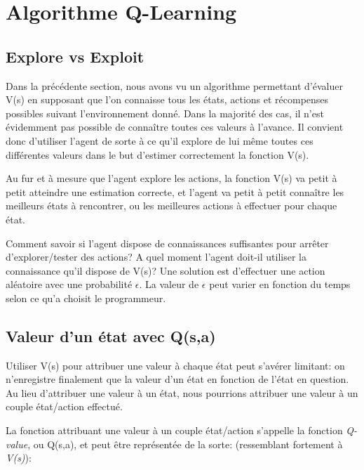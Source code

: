 \documentclass[11pt,a4paper]{report}
\begin{document}
  \section{Algorithme Q-Learning}
  
  \subsection{Explore vs Exploit} 
  
    \par Dans la précédente section, nous avons vu un algorithme permettant d'évaluer V(s) en supposant que l'on connaisse tous les états, actions et récompenses possibles suivant l'environnement donné. Dans la majorité des cas, il n'est évidemment pas possible de connaître toutes ces valeurs à l'avance. Il convient donc d'utiliser l'agent de sorte à ce qu'il explore de lui même toutes ces différentes valeurs dans le but d'estimer correctement la fonction V(s).     
    
    \par Au fur et à mesure que l'agent explore les actions, la fonction V(s) va petit à petit atteindre une estimation correcte, et l'agent va petit à petit connaître les meilleurs états à rencontrer, ou les meilleures actions à effectuer pour chaque état. 
    
    \par Comment savoir si l'agent dispose de connaissances suffisantes pour arrêter d'explorer/tester des actions? A quel moment l'agent doit-il utiliser la connaissance qu'il dispose de V(s)? Une solution est d'effectuer une action aléatoire avec une probabilité $\epsilon$. La valeur de $\epsilon$ peut varier en fonction du temps selon ce qu'a choisit le programmeur. 
  
  \subsection{Valeur d'un état avec Q(s,a)}
  
    \par Utiliser V(s) pour attribuer une valeur à chaque état peut s'avérer limitant: on n'enregistre finalement que la valeur d'un état en fonction de l'état en question. Au lieu d'attribuer une valeur à un état, nous pourrions attribuer une valeur à un couple état/action effectué. 
    
    \par La fonction attribuant une valeur à un couple état/action s'appelle la fonction \textit{Q-value}, ou Q(s,a), et peut être représentée de la sorte: (ressemblant fortement à \textit{V(s)}): 
        
\end{document}
